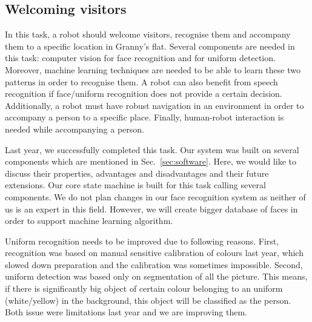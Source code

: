 
\subsection{Welcoming visitors}

In this task, a robot should welcome visitors, recognise them and accompany them to a specific location in Granny's flat. Several components are needed in this task: computer vision for face recognition and for uniform detection. Moreover, machine learning techniques are needed to be able to learn these two patterns in order to recognise them. A robot can also benefit from speech recognition if face/uniform recognition does not provide a certain decision. Additionally, a robot must have robust navigation in an environment in order to accompany a person to a specific place. 
Finally, human-robot interaction is needed while accompanying a person.

Last year, we successfully completed this task. Our system was built on several components which are mentioned in Sec.~\ref{sec:software}. 
Here, we would like to discuss their properties, advantages and disadvantages and their future extensions. 
Our core state machine is built for this task calling several components. 
We do not plan changes in our face recognition system as neither of us is an expert in this field. 
However, we will create bigger database of faces in order to support machine learning algorithm.

Uniform recognition needs to be improved due to following reasons.
First, recognition was based on manual sensitive calibration of colours last year, which slowed down preparation and the calibration was sometimes impossible. 
Second, uniform detection was based only on segmentation of all the picture. This means, if there is significantly big object of certain colour belonging to an uniform (white/yellow) in the background, this object will be classified as the person. 
Both issue were limitations last year and we are improving them.  

